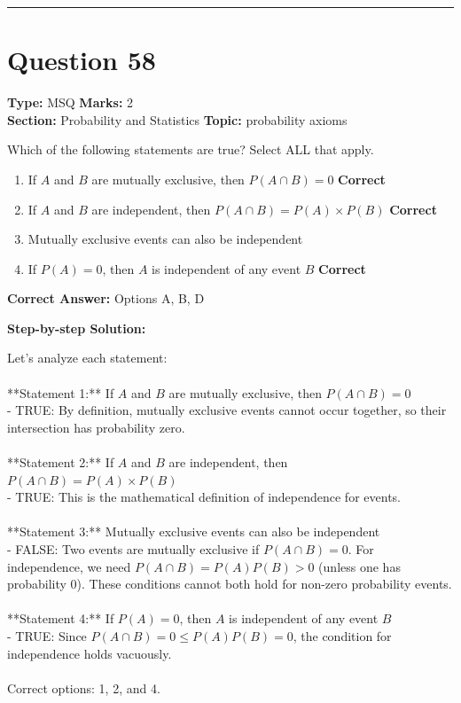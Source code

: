 \documentclass[11pt]{article}
\begin{document}
\vspace{0.8em}
\hrule
\vspace{0.4em}
\section*{Question 58}
\textbf{Type:} MSQ \hfill \textbf{Marks:} 2\\
\textbf{Section:} Probability and Statistics \hfill \textbf{Topic:} probability axioms

Which of the following statements are true? Select ALL that apply.


\begin{enumerate}[label=\textbf{\Alph*.}, leftmargin=1.8em]
\item If \(A\) and \(B\) are mutually exclusive, then \(P(A \cap B) = 0\) \hfill {\color{gategreen}\textbf{Correct}}\item If \(A\) and \(B\) are independent, then \(P(A \cap B) = P(A) \times P(B)\) \hfill {\color{gategreen}\textbf{Correct}}\item Mutually exclusive events can also be independent\item If \(P(A) = 0\), then \(A\) is independent of any event \(B\) \hfill {\color{gategreen}\textbf{Correct}}\end{enumerate}

\textbf{Correct Answer:} Options A, B, D

\textbf{Step-by-step Solution:}

Let's analyze each statement:\\
\\
**Statement 1:** If \(A\) and \(B\) are mutually exclusive, then \(P(A \cap B) = 0\)\\
- TRUE: By definition, mutually exclusive events cannot occur together, so their intersection has probability zero.\\
\\
**Statement 2:** If \(A\) and \(B\) are independent, then \(P(A \cap B) = P(A) \times P(B)\)\\
- TRUE: This is the mathematical definition of independence for events.\\
\\
**Statement 3:** Mutually exclusive events can also be independent\\
- FALSE: Two events are mutually exclusive if \(P(A \cap B) = 0\). For independence, we need \(P(A \cap B) = P(A)P(B) > 0\) (unless one has probability 0). These conditions cannot both hold for non-zero probability events.\\
\\
**Statement 4:** If \(P(A) = 0\), then \(A\) is independent of any event \(B\)\\
- TRUE: Since \(P(A \cap B) = 0 \leq P(A)P(B) = 0\), the condition for independence holds vacuously.\\
\\
Correct options: 1, 2, and 4.
\end{document}
